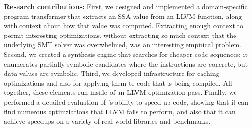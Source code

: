 \textbf{Research contributions:}
%
First, we designed and implemented a domain-specific program
transformer that extracts an SSA value from an LLVM function, along
with context about how that value was computed.
%
Extracting enough context to permit interesting optimizations, without
extracting so much context that the underlying SMT solver was
overwhelmed, was an interesting empirical problem.
%
Second, we created a synthesis engine that searches for cheaper code
sequences; it enumerates partially symbolic candidates where the
instructions are concrete, but data values are symbolic.
%
Third, we developed infrastructure for caching optimizations and also
for applying them to code that is being compiled.
%
All together, these elements run inside of an LLVM optimization pass.
%
Finally, we performed a detailed evaluation of \minotaur's ability to
speed up code, showing that it can find numerous optimziations that
LLVM fails to perform, and also that it can achieve speedups on a
variety of real-world libraries and benchmarks.

